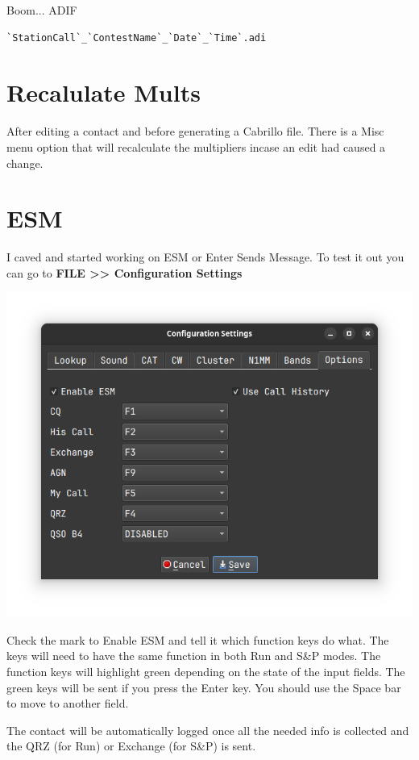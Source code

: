 \documentclass{article}
\begin{document}
Boom... ADIF
\begin{verbatim}
`StationCall`_`ContestName`_`Date`_`Time`.adi
\end{verbatim}

\section{Recalulate Mults}

After editing a contact and before generating a Cabrillo file. There is a Misc menu option that will recalculate the multipliers incase an edit had caused a change.
\newpage
\section{ESM}

I caved and started working on ESM or Enter Sends Message. To test it out you can go to \textbf{FILE >> Configuration Settings}

\vspace{0.5cm}
\includegraphics[width=0.9\linewidth]{pic/configuration_options.png}
\vspace{0.5cm}

Check the mark to Enable ESM and tell it which function keys do what. The keys will need to have the same function in both Run and S\&P modes. The function keys will highlight green depending on the state of the input fields. The green keys will be sent if you press the Enter key. You should use the Space bar to move to another field.

The contact will be automatically logged once all the needed info is collected and the QRZ (for Run) or Exchange (for S\&P) is sent.
\end{document}
